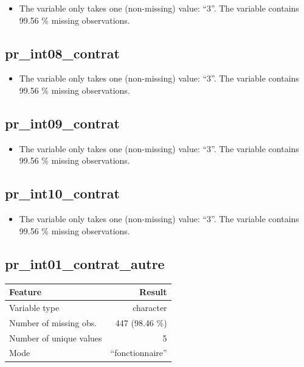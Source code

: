 \documentclass[
  letterpaper,
  DIV=11,
  numbers=noendperiod]{scrartcl}
\providecommand{\tightlist}{%
  \setlength{\itemsep}{0pt}\setlength{\parskip}{0pt}}
\begin{document}
\begin{itemize}
\tightlist
\item
  The variable only takes one (non-missing) value: ``3''. The variable
  contains 99.56 \% missing observations.
\end{itemize}

\fullline

\subsection{pr\_int08\_contrat}\label{pr_int08_contrat}

\begin{itemize}
\tightlist
\item
  The variable only takes one (non-missing) value: ``3''. The variable
  contains 99.56 \% missing observations.
\end{itemize}

\fullline

\subsection{pr\_int09\_contrat}\label{pr_int09_contrat}

\begin{itemize}
\tightlist
\item
  The variable only takes one (non-missing) value: ``3''. The variable
  contains 99.56 \% missing observations.
\end{itemize}

\fullline

\subsection{pr\_int10\_contrat}\label{pr_int10_contrat}

\begin{itemize}
\tightlist
\item
  The variable only takes one (non-missing) value: ``3''. The variable
  contains 99.56 \% missing observations.
\end{itemize}

\fullline

\subsection{pr\_int01\_contrat\_autre}\label{pr_int01_contrat_autre}

\bminione

\begin{longtable}[]{@{}lr@{}}
\toprule\noalign{}
Feature & Result \\
\midrule\noalign{}
\endhead
\bottomrule\noalign{}
\endlastfoot
Variable type & character \\
Number of missing obs. & 447 (98.46 \%) \\
Number of unique values & 5 \\
Mode & ``fonctionnaire'' \\
\end{longtable}
\end{document}
